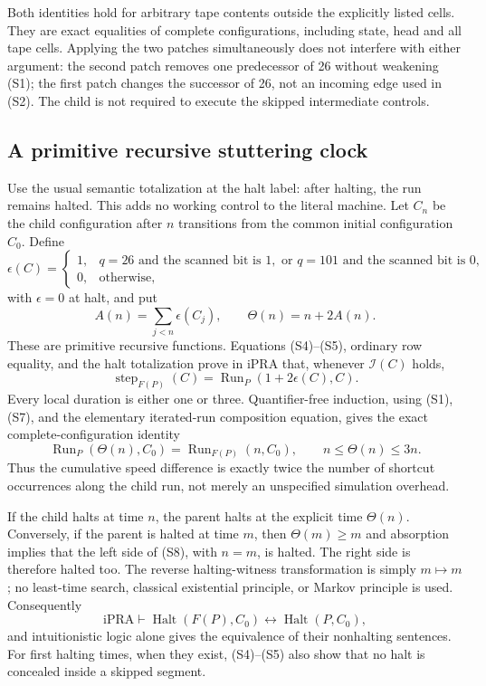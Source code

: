 Both identities hold for arbitrary tape contents outside the explicitly
listed cells.  They are exact equalities of complete configurations,
including state, head and all tape cells.  Applying the two patches
simultaneously does not interfere with either argument: the second patch
removes one predecessor of 26 without weakening (S1); the first patch
changes the successor of 26, not an incoming edge used in (S2).  The child
is not required to execute the skipped intermediate controls.

\subsection{A primitive recursive stuttering clock}

Use the usual semantic totalization at the halt label: after halting, the
run remains halted.  This adds no working control to the literal machine.
Let $C_n$ be the child configuration after $n$ transitions from the common
initial configuration $C_0$.  Define
\[
 \epsilon(C)=
  \begin{cases}
   1,&q=26\text{ and the scanned bit is }1,\text{ or }q=101
                         \text{ and the scanned bit is }0,\\
   0,&\text{otherwise},
  \end{cases}
\]
with $\epsilon=0$ at halt, and put
\[
 A(n)=\sum_{j<n}\epsilon(C_j),\qquad
             \Theta(n)=n+2A(n).                             \tag{S6}
\]
These are primitive recursive functions.  Equations (S4)--(S5), ordinary
row equality, and the halt totalization prove in iPRA that, whenever
$\mathcal I(C)$ holds,
\[
 \operatorname{step}_{F(P)}(C)
       =\operatorname{Run}_P(1+2\epsilon(C),C).              \tag{S7}
\]
Every local duration is either one or three.  Quantifier-free induction,
using (S1), (S7), and the elementary iterated-run composition equation,
gives the exact complete-configuration identity
\[
 \boxed{\quad
    \operatorname{Run}_P(\Theta(n),C_0)
       =\operatorname{Run}_{F(P)}(n,C_0),\qquad
       n\le\Theta(n)\le3n.\quad}                           \tag{S8}
\]
Thus the cumulative speed difference is exactly twice the number of
shortcut occurrences along the child run, not merely an unspecified
simulation overhead.

If the child halts at time $n$, the parent halts at the explicit time
$\Theta(n)$.  Conversely, if the parent is halted at time $m$, then
$\Theta(m)\ge m$ and absorption implies that the left side of (S8), with
$n=m$, is halted.  The right side is therefore halted too.  The reverse
halting-witness transformation is simply $m\mapsto m$; no least-time
search, classical existential principle, or Markov principle is used.
Consequently
\[
 \mathrm{iPRA}\vdash
 \operatorname{Halt}(F(P),C_0)\longleftrightarrow
 \operatorname{Halt}(P,C_0),
\]
and intuitionistic logic alone gives the equivalence of their nonhalting
sentences.  For first halting times, when they exist, (S4)--(S5) also show
that no halt is concealed inside a skipped segment.


